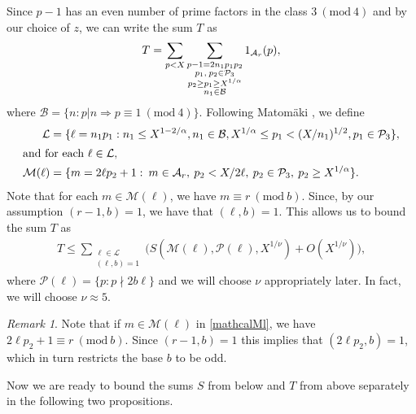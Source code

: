 \documentclass[12pt]{amsart}
\numberwithin{equation}{section}
\theoremstyle{remark}
\newtheorem*{remark}{Remark}
\theoremstyle{definition}
\newcommand{\imod}[1]{\ (\mathrm{mod}\ #1)}
\begin{document}
Since $p-1$ has an even number of prime factors in the class $3\imod 4$ and by our choice of $z$, we can write the sum $T$ as 
\begin{align}
\notag T=\sum_{p<X}\sum_{\substack{p-1=2n_1p_1p_2\\p_1,\: p_2\in \mathcal{P}_3\\p_2\geq p_1\geq X^{1/\alpha}\\n_1\in \mathcal{B}}}1_{\mathcal{A}_r}(p),
\end{align}
where $\mathcal{B}=\{n: p|n \Rightarrow p\equiv 1\imod 4\}$.
Following Matom\"aki \cite{Mat}, we define
\begin{align}
\label{mathcalL} \mathcal{L}&=\{\ell  =n_1p_1: n_1\leq X^{1-2/\alpha}, n_1\in \mathcal{B}, X^{1/\alpha}\leq p_1 <(X/n_1)^{1/2}, p_1\in \mathcal{P}_3\},\\
\intertext{and for each $\ell \in \mathcal{L}$,}
\label{mathcalMl} \mathcal{M}(\ell)& ={\{m=2\ell p_2+1:\: m \in \mathcal{A}_r,\: p_2< X/2\ell, \: p_2\in \mathcal{P}_3,\: p_2\geq X^{1/\alpha}\}}.
\end{align}
Note that for each $m\in \mathcal{M}(\ell)$, we have $m\equiv r\imod b$. Since, by our assumption $(r-1, b)=1$, we have that $(\ell, b)=1$.
This allows us to bound the sum $T$ as
\begin{align}
\label{Tsimple} T\leq \sum_{\substack{\ell \in \mathcal{L}\\(\ell, b)=1}}\bigg(S(\mathcal{M}(\ell), \mathcal{P}(\ell), X^{1/\nu}) + O(X^{1/\nu})\bigg),
\end{align}
where $\mathcal{P}(\ell)=\{p: p\nmid 2b\ell\}$ and we will choose $\nu$ appropriately later. In fact, we will choose $\nu \approx 5$.

\begin{remark}
Note that if $m\in \mathcal{M}(\ell)$ in \eqref{mathcalMl}, we have $2\ell p_2+1\equiv r\imod b$. Since $(r-1, b)=1$ this implies that $(2\ell p_2, b)=1$, which in turn restricts the base $b$ to be odd.
\end{remark}

Now we are ready to bound the sums $S$ from below and $T$ from above separately in the following two propositions.
\end{document}
